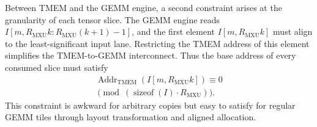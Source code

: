 \documentclass[sigconf,anonymous,nonacm]{acmart}
\newcommand{\fpint}{FP-INT}
\begin{document}
Between TMEM and the GEMM engine, a second constraint arises at the granularity of each tensor slice. The GEMM engine reads $I[m, R_{\mathrm{MXU}} k : R_{\mathrm{MXU}}(k+1)-1]$, and the first element $I[m, R_{\mathrm{MXU}} k]$ must align to the least-significant input lane. Restricting the TMEM address of this element simplifies the TMEM-to-GEMM interconnect. Thus the base address of every consumed slice must satisfy
\begin{multline}
    \operatorname{Addr}_{\mathrm{TMEM}}
    \left(I\left[m, R_{\mathrm{MXU}} k\right]\right)
    \equiv 0 \\
    \pmod{
        \left(
            \operatorname{sizeof}(I) \cdot R_{\mathrm{MXU}}
        \right)
    } .
    \label{eq:tmem_gemm_addr_constr}
\end{multline}
This constraint is awkward for arbitrary copies but easy to satisfy for regular GEMM tiles through layout transformation and aligned allocation.

\end{document}
